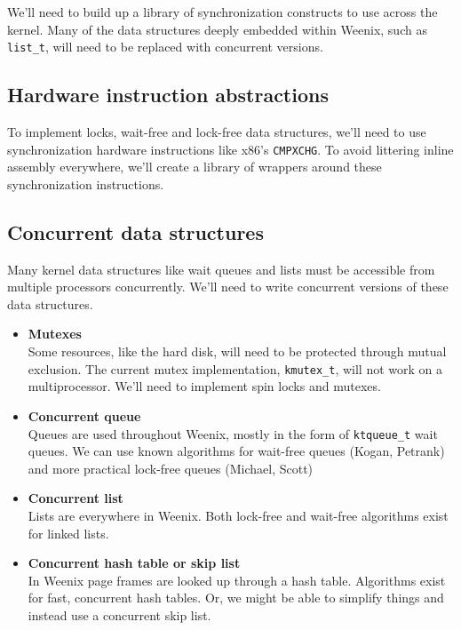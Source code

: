 \documentclass{article}
\begin{document}
We'll need to build up a library of synchronization constructs to use across the kernel. Many of
the data structures deeply embedded within Weenix, such as {\tt{list\_t}}, will need to be
replaced with concurrent versions.

\subsection{Hardware instruction abstractions}

To implement locks, wait-free and lock-free data structures, we'll need to use synchronization 
hardware instructions like x86's {\tt{CMPXCHG}}. To avoid littering inline assembly everywhere,
we'll create a library of wrappers around these synchronization instructions.

\subsection{Concurrent data structures}

Many kernel data structures like wait queues and lists must be accessible from multiple
processors concurrently. We'll need to write concurrent versions of these data structures.

\begin{itemize}
    \item \textbf{Mutexes}\\
    Some resources, like the hard disk, will need to be protected through mutual exclusion. The current mutex
    implementation, {\tt{kmutex\_t}}, will not work on a multiprocessor. We'll need to implement
    spin locks and mutexes.
    \item \textbf{Concurrent queue}\\
    Queues are used throughout Weenix, mostly in the form of {\tt{ktqueue\_t}} wait queues. We can
    use known algorithms for wait-free queues (Kogan, Petrank) and more practical lock-free queues (Michael, Scott) 
    \item \textbf{Concurrent list}\\
    Lists are everywhere in Weenix. Both lock-free and wait-free algorithms exist for linked lists.
    \item \textbf{Concurrent hash table or skip list}\\
    In Weenix page frames are looked up through a hash table. Algorithms exist for fast, concurrent hash tables. Or,
    we might be able to simplify things and instead use a concurrent skip list.
\end{itemize}
\end{document}
